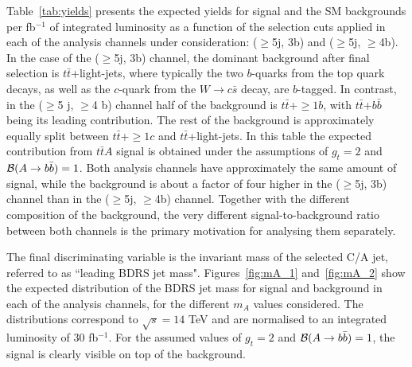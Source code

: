 \documentclass[preprintnumbers,superscriptaddress,nofootinbib,aps,prd,floatfix]{revtex4}
\newcommand{\ttbar}{\ensuremath{t\bar{t}}}
\begin{document}
Table~\ref{tab:yields} presents the expected yields for signal and the SM backgrounds 
per fb$^{-1}$ of integrated luminosity as a function of the selection cuts applied in each
of the analysis channels under consideration: ($\geq$5j, 3b) and ($\geq$5j, $\geq$4b).
In the case of the ($\geq$5j, 3b) channel, the dominant background after final selection
is $\ttbar$+light-jets, where typically the two $b$-quarks from the  top quark decays, as well as
the $c$-quark from the $W \to c\bar{s}$ decay, are $b$-tagged.
In contrast, in the ($\geq$5 j, $\geq$4 b) channel half of the background is $\ttbar$+$\geq$$1b$,
with $\ttbar$+$b\bar{b}$ being its leading contribution. The rest of the background is approximately 
equally split between $\ttbar$+$\geq$$1c$ and $\ttbar$+light-jets.
In this table the expected contribution from $\ttbar A$ signal is obtained under the assumptions of $g_t=2$ and ${\cal B}(A\to b\bar{b})=1$.
Both analysis channels have approximately the same amount of signal, while the background
is about a factor of four higher in the ($\geq$5j, 3b) channel than in the  ($\geq$5j, $\geq$4b) channel.
Together with the different composition of the background, the very different signal-to-background
ratio between both channels is the primary motivation for analysing them separately.

The final discriminating variable is the invariant mass of the selected C/A jet, referred to as 
``leading BDRS jet mass". Figures~\ref{fig:mA_1} and~\ref{fig:mA_2} show the expected distribution of the BDRS jet mass
for signal and background in each of the analysis channels, for the different $m_A$ values considered. The distributions
correspond to $\sqrt{s}=14$ TeV and are normalised to an integrated luminosity of 30 fb$^{-1}$.
For the assumed values of $g_t=2$ and ${\cal B}(A\to b\bar{b})=1$, the signal is clearly visible
on top of the background.
\end{document}
